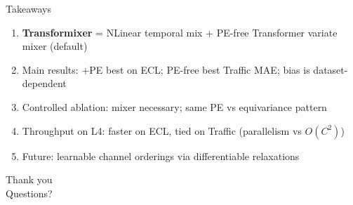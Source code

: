 \documentclass[aspectratio=169,11pt]{beamer}
\begin{document}
\begin{frame}{Takeaways}
  \begin{enumerate}
    \item \textbf{Transformixer} = NLinear temporal mix + PE-free Transformer variate mixer (default)
    \item Main results: +PE best on ECL; PE-free best Traffic MAE; bias is dataset-dependent
    \item Controlled ablation: mixer necessary; same PE vs equivariance pattern
    \item Throughput on L4: faster on ECL, tied on Traffic (parallelism vs $O(C^2)$)
    \item Future: learnable channel orderings via differentiable relaxations
  \end{enumerate}

  \vspace{1.2em}
  \centering
  {\Large Thank you}\\[0.6em]
  {\small Questions?}
\end{frame}
\end{document}
